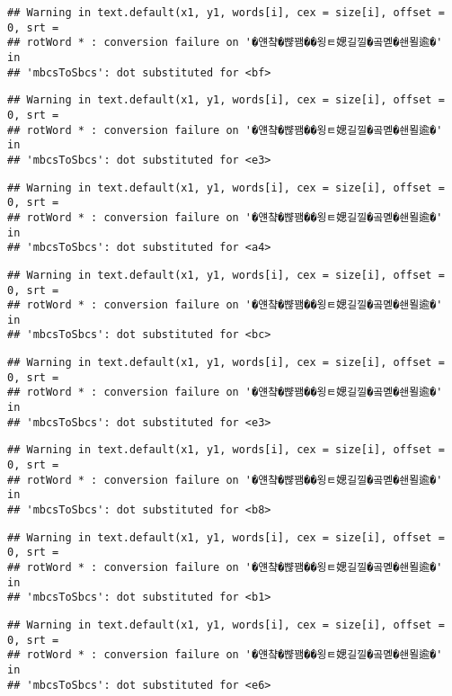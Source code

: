 \documentclass[]{article}
\begin{document}
\begin{verbatim}
## Warning in text.default(x1, y1, words[i], cex = size[i], offset = 0, srt =
## rotWord * : conversion failure on '�얜챸�뺞꽴��욍ㅌ媤길낄�곸몓�쇈묄逾�' in
## 'mbcsToSbcs': dot substituted for <bf>
\end{verbatim}

\begin{verbatim}
## Warning in text.default(x1, y1, words[i], cex = size[i], offset = 0, srt =
## rotWord * : conversion failure on '�얜챸�뺞꽴��욍ㅌ媤길낄�곸몓�쇈묄逾�' in
## 'mbcsToSbcs': dot substituted for <e3>
\end{verbatim}

\begin{verbatim}
## Warning in text.default(x1, y1, words[i], cex = size[i], offset = 0, srt =
## rotWord * : conversion failure on '�얜챸�뺞꽴��욍ㅌ媤길낄�곸몓�쇈묄逾�' in
## 'mbcsToSbcs': dot substituted for <a4>
\end{verbatim}

\begin{verbatim}
## Warning in text.default(x1, y1, words[i], cex = size[i], offset = 0, srt =
## rotWord * : conversion failure on '�얜챸�뺞꽴��욍ㅌ媤길낄�곸몓�쇈묄逾�' in
## 'mbcsToSbcs': dot substituted for <bc>
\end{verbatim}

\begin{verbatim}
## Warning in text.default(x1, y1, words[i], cex = size[i], offset = 0, srt =
## rotWord * : conversion failure on '�얜챸�뺞꽴��욍ㅌ媤길낄�곸몓�쇈묄逾�' in
## 'mbcsToSbcs': dot substituted for <e3>
\end{verbatim}

\begin{verbatim}
## Warning in text.default(x1, y1, words[i], cex = size[i], offset = 0, srt =
## rotWord * : conversion failure on '�얜챸�뺞꽴��욍ㅌ媤길낄�곸몓�쇈묄逾�' in
## 'mbcsToSbcs': dot substituted for <b8>
\end{verbatim}

\begin{verbatim}
## Warning in text.default(x1, y1, words[i], cex = size[i], offset = 0, srt =
## rotWord * : conversion failure on '�얜챸�뺞꽴��욍ㅌ媤길낄�곸몓�쇈묄逾�' in
## 'mbcsToSbcs': dot substituted for <b1>
\end{verbatim}

\begin{verbatim}
## Warning in text.default(x1, y1, words[i], cex = size[i], offset = 0, srt =
## rotWord * : conversion failure on '�얜챸�뺞꽴��욍ㅌ媤길낄�곸몓�쇈묄逾�' in
## 'mbcsToSbcs': dot substituted for <e6>
\end{verbatim}
\end{document}
